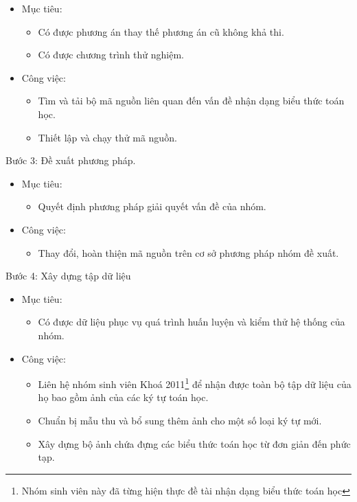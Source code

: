 \documentclass[a4paper,12pt]{article}
\begin{document}
	\begin{itemize}
		\item Mục tiêu: 
		\begin{itemize}
			\item Có được phương án thay thế phương án cũ không khả thi.
			\item Có được chương trình thử nghiệm.
		\end{itemize}
		\item Công việc:
		\begin{itemize}
			\item Tìm và tải bộ mã nguồn liên quan đến vấn đề nhận dạng biểu thức toán học\cite{github}.
			\item Thiết lập và chạy thử mã nguồn.
			
		\end{itemize}
	\end{itemize}
	Bước 3: Đề xuất phương pháp.
	\begin{itemize}
		\item Mục tiêu:
		\begin{itemize}
			\item Quyết định phương pháp giải quyết vấn đề của nhóm.
			
		\end{itemize}
		\item Công việc:
		\begin{itemize}
			\item Thay đổi, hoàn thiện mã nguồn trên cơ sở phương pháp nhóm đề xuất.
			
		\end{itemize}
	\end{itemize}
	Bước 4: Xây dựng tập dữ liệu
	\begin{itemize}
		\item Mục tiêu:
		\begin{itemize}
			\item Có được dữ liệu phục vụ quá trình huấn luyện và kiểm thử hệ thống của nhóm.
			
		\end{itemize}
		\item Công việc:
		\begin{itemize}
			\item Liên hệ nhóm sinh viên Khoá 2011\footnote{Nhóm sinh viên này đã từng hiện thực đề tài nhận dạng biểu thức toán học} để nhận được toàn bộ tập dữ liệu của họ bao gồm ảnh của các ký tự toán học.
			\item Chuẩn bị mẫu thu và bổ sung thêm ảnh cho một số loại ký tự mới.
			\item Xây dựng bộ ảnh chứa đựng các biểu thức toán học từ đơn giản đến phức tạp.
		\end{itemize}
	\end{itemize}
\end{document}
